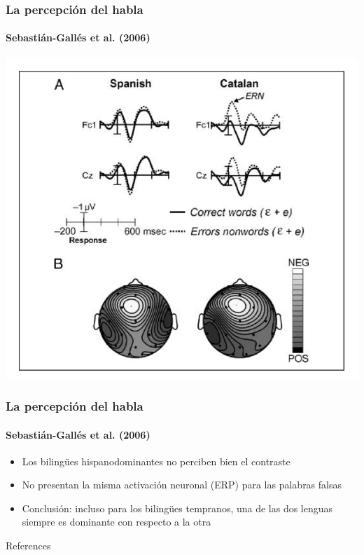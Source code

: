 \documentclass{beamer}
\begin{document}
\begin{frame} 
	\frametitle{La percepción del habla}
	\framesubtitle{Sebastián-Gallés et al. (2006)}
	
	\begin{center}
		\includegraphics[scale=.25]{figures/sebas.png}
	\end{center}
\end{frame}

\begin{frame} 
	\frametitle{La percepción del habla}
	\framesubtitle{Sebastián-Gallés et al. (2006)}
	
	\begin{itemize}
		\item Los bilingües hispanodominantes no perciben bien el contraste 
		\item No presentan la misma activación neuronal (ERP) para las palabras falsas 
		\item Conclusión: incluso para los bilingües tempranos, una de las dos lenguas siempre es dominante con respecto a la otra
	\end{itemize}
\end{frame}

\begin{frame}[allowframebreaks]{References}
	
	
\end{frame}
\end{document}

